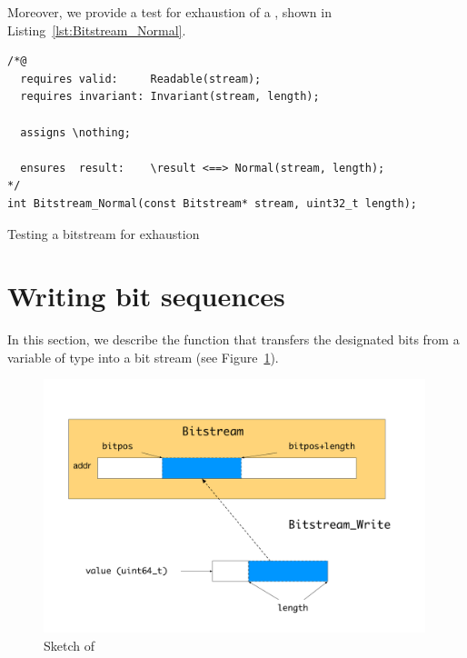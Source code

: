 \FloatBarrier

Moreover, we provide a test for exhaustion of a ,
shown in Listing~\ref{lst:Bitstream_Normal}.


\begin{listing}[hbt]
\begin{minipage}{0.99\textwidth}
\begin{lstlisting}[style=acsl-block]
/*@
  requires valid:     Readable(stream);
  requires invariant: Invariant(stream, length);

  assigns \nothing;

  ensures  result:    \result <==> Normal(stream, length);
*/
int Bitstream_Normal(const Bitstream* stream, uint32_t length);
\end{lstlisting}
\end{minipage}
\caption{\label{lst:Bitstream_Normal}Testing a bitstream for exhaustion}
\end{listing}



\FloatBarrier


\section{Writing bit sequences}
\label{sec:writing bit sequences}

In this section, we describe the function  that
transfers the designated bits from a variable of type  into
a bit stream (see Figure~\ref{fig:bitstream-write}).


\begin{figure}[hbt]
\begin{center}
\includegraphics[width=0.99\textwidth]{figures/bitstream-write.pdf}
\caption{\label{fig:bitstream-write}
	Sketch of }
\end{center}
\end{figure}


